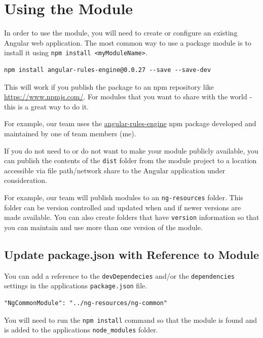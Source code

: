\documentclass[]{book}
\theoremstyle{definition}
\theoremstyle{definition}
\theoremstyle{definition}
\theoremstyle{remark}
\begin{document}
\chapter{Using the Module}\label{using-the-module}

In order to use the module, you will need to create or configure an
existing Angular web application. The most common way to use a package
module is to install it using
\texttt{npm\ install\ \textless{}myModuleName\textgreater{}}.

\begin{verbatim}
npm install angular-rules-engine@0.0.27 --save --save-dev
\end{verbatim}

This will work if you publish the package to an npm repository like
\url{https://www.npmjs.com/}. For modules that you want to share with
the world - this is a great way to do it.

For example, our team uses the
\href{https://www.npmjs.com/package/angular-rules-engine}{angular-rules-engine}
npm package developed and maintained by one of team members (me).

If you do not need to or do not want to make your module publicly
available, you can publish the contents of the \texttt{dist} folder from
the module project to a location accessible via file path/network share
to the Angular application under consideration.

For example, our team will publish modules to an \texttt{ng-resources}
folder. This folder can be version controlled and updated when and if
newer versions are made available. You can also create folders that have
\texttt{version} information so that you can maintain and use more than
one version of the module.

\section{Update package.json with Reference to
Module}\label{update-package.json-with-reference-to-module}

You can add a reference to the \texttt{devDependecies} and/or the
\texttt{dependencies} settings in the applications \texttt{package.json}
file.

\begin{verbatim}
"NgCommonModule": "../ng-resources/ng-common"
\end{verbatim}

You will need to run the \texttt{npm\ install} command so that the
module is found and is added to the applications \texttt{node\_modules}
folder.
\end{document}
